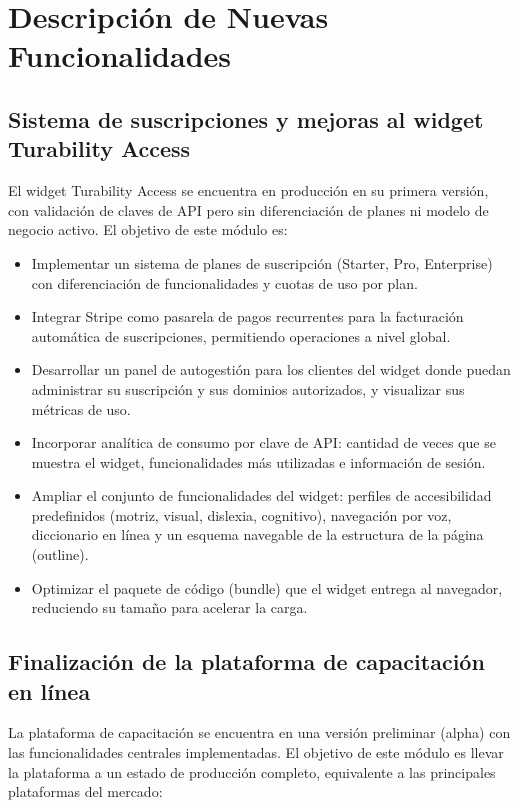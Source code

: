 \documentclass[12pt,a4paper]{article}
\begin{document}
\section*{Descripción de Nuevas Funcionalidades}
\subsection*{Sistema de suscripciones y mejoras al widget Turability Access}

El widget Turability Access se encuentra en producción en su primera versión, con validación de
claves de API pero sin diferenciación de planes ni modelo de negocio activo. El objetivo de
este módulo es:

\begin{itemize}[leftmargin=1.5cm]
  \item Implementar un sistema de planes de suscripción (Starter, Pro, Enterprise) con
        diferenciación de funcionalidades y cuotas de uso por plan.
  \item Integrar Stripe como pasarela de pagos recurrentes para la facturación automática
        de suscripciones, permitiendo operaciones a nivel global.
  \item Desarrollar un panel de autogestión para los clientes del widget donde puedan administrar
        su suscripción y sus dominios autorizados, y visualizar sus métricas de uso.
  \item Incorporar analítica de consumo por clave de API: cantidad de veces que se muestra el
        widget, funcionalidades más utilizadas e información de sesión.
  \item Ampliar el conjunto de funcionalidades del widget: perfiles de accesibilidad predefinidos
        (motriz, visual, dislexia, cognitivo), navegación por voz, diccionario en línea y un
        esquema navegable de la estructura de la página (outline).
  \item Optimizar el paquete de código (bundle) que el widget entrega al navegador, reduciendo
        su tamaño para acelerar la carga.
\end{itemize}

\subsection*{Finalización de la plataforma de capacitación en línea}

La plataforma de capacitación se encuentra en una versión preliminar (alpha) con las funcionalidades centrales
implementadas. El objetivo de este módulo es llevar la plataforma a un estado de producción
completo, equivalente a las principales plataformas del mercado:
\end{document}
